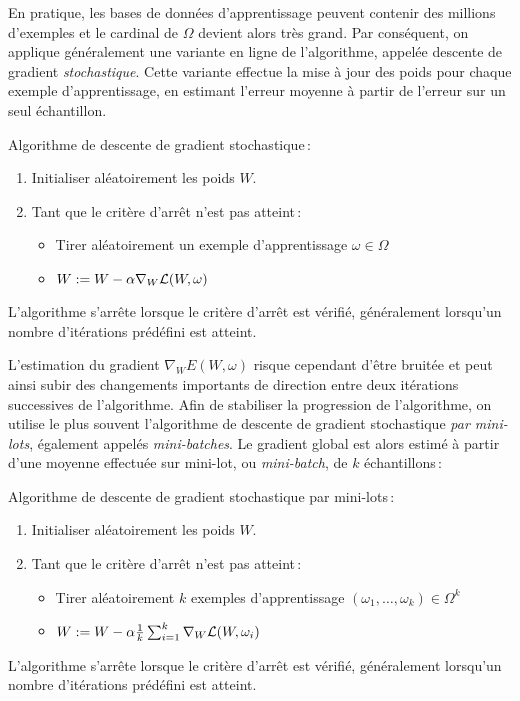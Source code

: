  En pratique, les bases de données d'apprentissage peuvent contenir des millions d'exemples et le cardinal de $\Omega$ devient alors très grand. Par conséquent, on applique généralement une variante en ligne de l'algorithme, appelée descente de gradient \emph{stochastique}. Cette variante effectue la mise à jour des poids pour chaque exemple d'apprentissage, en estimant l'erreur moyenne à partir de l'erreur sur un seul échantillon.
\begin{definition}
  Algorithme de descente de gradient stochastique\,:
  \begin{enumerate}
    \item Initialiser aléatoirement les poids $W$.
    \item Tant que le critère d'arrêt n'est pas atteint\,:
      \begin{itemize}
          \item Tirer aléatoirement un exemple d'apprentissage $\omega \in \Omega$
          \item $W := W - \alpha \nabla_W \mathcal{L}(W, \omega)$
      \end{itemize}
  \end{enumerate}
L'algorithme s'arrête lorsque le critère d'arrêt est vérifié, généralement lorsqu'un nombre d'itérations prédéfini est atteint.
\end{definition}

L'estimation du gradient $\nabla_W E(W, \omega)$ risque cependant d'être bruitée et peut ainsi subir des changements importants de direction entre deux itérations successives de l'algorithme. Afin de stabiliser la progression de l'algorithme, on utilise le plus souvent l'algorithme de descente de gradient stochastique \emph{par mini-lots}, également appelés \emph{mini-batches}. Le gradient global est alors estimé à partir d'une moyenne effectuée sur mini-lot, ou \emph{mini-batch}, de $k$ échantillons\,:
\begin{definition}
  Algorithme de descente de gradient stochastique par mini-lots\,:
  \begin{enumerate}
    \item Initialiser aléatoirement les poids $W$.
    \item Tant que le critère d'arrêt n'est pas atteint\,:
      \begin{itemize}
          \item Tirer aléatoirement $k$ exemples d'apprentissage $(\omega_1,\dots,\omega_k) \in \Omega^k$
          \item $W := W - \alpha \frac{1}{k} \sum_{i=1}^k \nabla_W \mathcal{L}(W, \omega_i)$
      \end{itemize}
  \end{enumerate}
L'algorithme s'arrête lorsque le critère d'arrêt est vérifié, généralement lorsqu'un nombre d'itérations prédéfini est atteint.
\end{definition}

